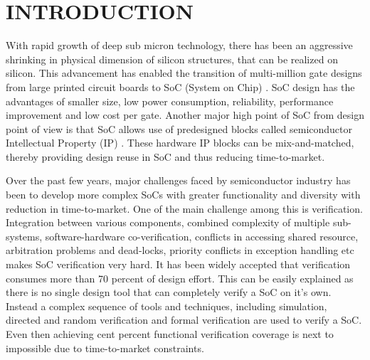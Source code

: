 \chapter{INTRODUCTION}

With rapid growth of deep sub micron technology, there has been an aggressive shrinking in physical dimension of silicon structures, that can be realized on silicon. This advancement has enabled the transition of multi-million gate designs from large printed circuit boards to SoC (System on Chip) . SoC design has the advantages of smaller size, low power consumption, reliability, performance improvement and low cost per gate. Another major high point of SoC from design point of view is that SoC allows use of predesigned blocks called semiconductor Intellectual Property (IP) . These hardware IP blocks can be mix-and-matched, thereby providing design reuse in SoC and thus reducing time-to-market. 


 Over the past few years, major challenges faced by semiconductor industry has been to develop more complex SoCs with greater functionality and diversity with reduction in time-to-market. One of the main challenge among this is verification\cite{soc}. Integration between various components, combined complexity of multiple sub-systems, software-hardware co-verification, conflicts in accessing shared resource, arbitration problems and dead-locks, priority conflicts in exception handling etc makes SoC verification very hard. It has been widely accepted that verification consumes more than 70 percent of design effort\cite{phd:zhang}. This can be easily explained as there is no single design tool that can completely verify a SoC on it's own. Instead a complex sequence of tools and techniques, including simulation, directed and random verification and formal verification are used to verify a SoC. Even then achieving cent percent functional verification coverage is next to impossible due to time-to-market constraints.


